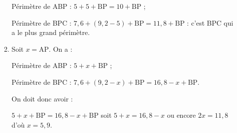 \begin{enumerate}
\begin{enumerate}
Périmètre de ABP : $5 + 5 + \text{BP} = 10 + \text{BP}$ ;

Périmètre de BPC : $7,6 + (9,2 - 5) + \text{BP} = 11,8 + \text{BP}$ : c'est BPC qui a le plus grand périmètre. 
		\item %

Soit $x = \text{AP}$. On a :

Périmètre de ABP : $5 + x + \text{BP}$ ;

Périmètre de BPC : $7,6 + (9,2 - x) + \text{BP} = 16,8  - x + \text{BP}$.

On doit donc avoir :

$5 + x + \text{BP} = 16,8  - x + \text{BP}$ soit $5 + x  = 16,8 - x$ ou encore $2x = 11,8$ d'où $x = 5,9$.
	\end{enumerate} 
\end{enumerate} 

\bigskip
 
